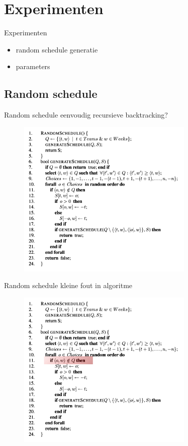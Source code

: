 \documentclass{beamer}
\begin{document}
\section{Experimenten}


\begin{frame}{Experimenten}
\begin{itemize}
 \item random schedule generatie
 \item parameters

\end{itemize}

\end{frame}
\subsection*{Random schedule}

\begin{frame}{Random schedule}
 eenvoudig recursieve backtracking? 
\begin{figure}[H]
 \includegraphics[width=0.75\textwidth]{randomscheduleALG}
\end{figure}
\end{frame}

\begin{frame}{Random schedule}
kleine fout in algoritme
\begin{figure}[H]
 \includegraphics[width=0.75\textwidth]{randomscheduleALG_phixr}
\end{figure}
\end{frame}
\end{document}
